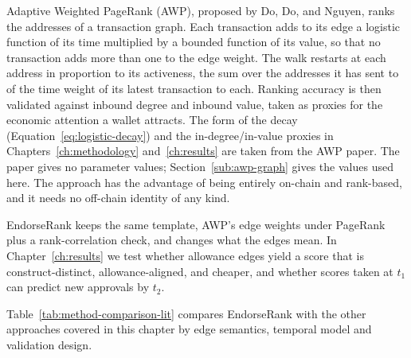Adaptive Weighted PageRank (AWP), proposed by Do, Do, and Nguyen, ranks the addresses of a transaction graph. Each transaction adds to its edge a logistic function of its time multiplied by a bounded function of its value, so that no transaction adds more than one to the edge weight. The walk restarts at each address in proportion to its activeness, the sum over the addresses it has sent to of the time weight of its latest transaction to each. Ranking accuracy is then validated against inbound degree and inbound value, taken as proxies for the economic attention a wallet attracts. The form of the decay (Equation~\eqref{eq:logistic-decay}) and the in-degree/in-value proxies in Chapters~\ref{ch:methodology} and~\ref{ch:results} are taken from the AWP paper. The paper gives no parameter values; Section~\ref{sub:awp-graph} gives the values used here. The approach has the advantage of being entirely on-chain and rank-based, and it needs no off-chain identity of any kind.

EndorseRank keeps the same template, AWP's edge weights under PageRank plus a rank-correlation check, and changes what the edges mean. In Chapter~\ref{ch:results} we test whether allowance edges yield a score that is construct-distinct, allowance-aligned, and cheaper, and whether scores taken at $t_1$ can predict new approvals by $t_2$.


Table~\ref{tab:method-comparison-lit} compares EndorseRank with the other approaches covered in this chapter by edge semantics, temporal model and validation design.

